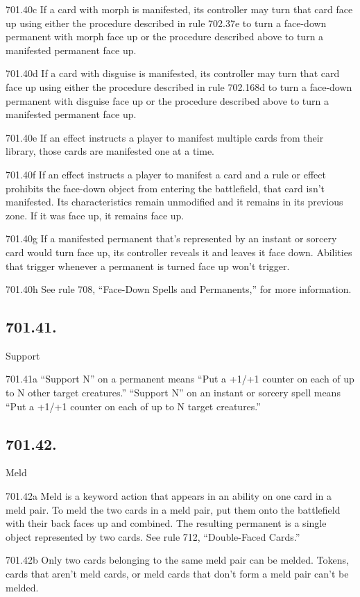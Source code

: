 701.40c If a card with morph is manifested, its controller may turn that card face up using either the procedure described in rule 702.37e to turn a face-down permanent with morph face up or the procedure described above to turn a manifested permanent face up.

701.40d If a card with disguise is manifested, its controller may turn that card face up using either the procedure described in rule 702.168d to turn a face-down permanent with disguise face up or the procedure described above to turn a manifested permanent face up.

701.40e If an effect instructs a player to manifest multiple cards from their library, those cards are manifested one at a time.

701.40f If an effect instructs a player to manifest a card and a rule or effect prohibits the face-down object from entering the battlefield, that card isn’t manifested. Its characteristics remain unmodified and it remains in its previous zone. If it was face up, it remains face up.

701.40g If a manifested permanent that’s represented by an instant or sorcery card would turn face up, its controller reveals it and leaves it face down. Abilities that trigger whenever a permanent is turned face up won’t trigger.

701.40h See rule 708, “Face-Down Spells and Permanents,” for more information.

\subsection*{701.41.}
Support

701.41a “Support N” on a permanent means “Put a +1/+1 counter on each of up to N other target creatures.” “Support N” on an instant or sorcery spell means “Put a +1/+1 counter on each of up to N target creatures.”

\subsection*{701.42.}
Meld

701.42a Meld is a keyword action that appears in an ability on one card in a meld pair. To meld the two cards in a meld pair, put them onto the battlefield with their back faces up and combined. The resulting permanent is a single object represented by two cards. See rule 712, “Double-Faced Cards.”

701.42b Only two cards belonging to the same meld pair can be melded. Tokens, cards that aren’t meld cards, or meld cards that don’t form a meld pair can’t be melded.

